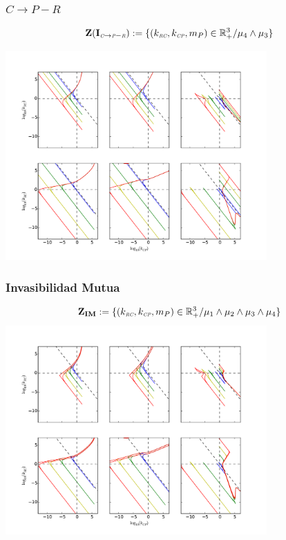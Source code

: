 \documentclass[11 pt,t]{beamer}
\newcommand{\PP}{\textit{\tiny P}}
\newcommand{\CC}{\textit{\tiny C}}
\newcommand{\R}{\textit{\tiny R}}
\newcommand{\CP}{\textit{\tiny CP}}
\newcommand{\RC}{\textit{\tiny RC}}
\begin{document}
\begin{frame}
  \frametitle{$C \to P-R$}
  \begin{equation}
\mathbf{Z(I_{\CC \to \PP-\R})} := \{ (k_{\RC},k_{\CP},m_P) \in \mathbb{R}^3_+ / \mu_4 \land \mu_3 \}
\end{equation}

  \centering
  \includegraphics[width = 0.75\textwidth]{../manuscript/Plots/Z(IC5)AcGrGr.pdf}
\end{frame}
\begin{frame}
  \frametitle{Invasibilidad Mutua}
  \begin{equation}
\mathbf{Z_{IM}} := \{ (k_{\RC},k_{\CP},m_P) \in \mathbb{R}^3_+ / \mu_1 \land \mu_2 \land \mu_3 \land \mu_4 \}
\end{equation}
\centering
\includegraphics[width = 0.75\textwidth]{../manuscript/Plots/MutualInvAcGrGr.pdf}

\end{frame}
\end{document}
